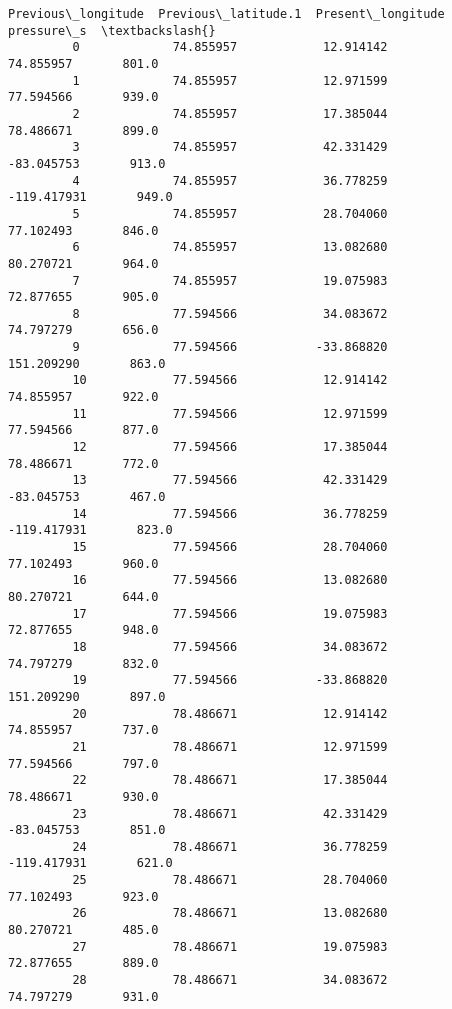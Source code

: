 \documentclass[11pt]{article}
\begin{document}
\begin{Verbatim}[commandchars=\\\{\}]
              Previous\_longitude  Previous\_latitude.1  Present\_longitude  pressure\_s  \textbackslash{}
         0             74.855957            12.914142          74.855957       801.0   
         1             74.855957            12.971599          77.594566       939.0   
         2             74.855957            17.385044          78.486671       899.0   
         3             74.855957            42.331429         -83.045753       913.0   
         4             74.855957            36.778259        -119.417931       949.0   
         5             74.855957            28.704060          77.102493       846.0   
         6             74.855957            13.082680          80.270721       964.0   
         7             74.855957            19.075983          72.877655       905.0   
         8             77.594566            34.083672          74.797279       656.0   
         9             77.594566           -33.868820         151.209290       863.0   
         10            77.594566            12.914142          74.855957       922.0   
         11            77.594566            12.971599          77.594566       877.0   
         12            77.594566            17.385044          78.486671       772.0   
         13            77.594566            42.331429         -83.045753       467.0   
         14            77.594566            36.778259        -119.417931       823.0   
         15            77.594566            28.704060          77.102493       960.0   
         16            77.594566            13.082680          80.270721       644.0   
         17            77.594566            19.075983          72.877655       948.0   
         18            77.594566            34.083672          74.797279       832.0   
         19            77.594566           -33.868820         151.209290       897.0   
         20            78.486671            12.914142          74.855957       737.0   
         21            78.486671            12.971599          77.594566       797.0   
         22            78.486671            17.385044          78.486671       930.0   
         23            78.486671            42.331429         -83.045753       851.0   
         24            78.486671            36.778259        -119.417931       621.0   
         25            78.486671            28.704060          77.102493       923.0   
         26            78.486671            13.082680          80.270721       485.0   
         27            78.486671            19.075983          72.877655       889.0   
         28            78.486671            34.083672          74.797279       931.0   

\end{Verbatim}
\end{document}
